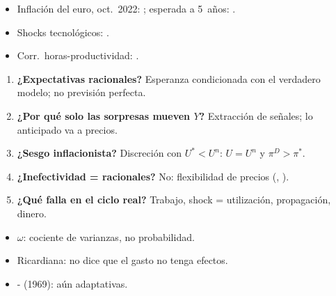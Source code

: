 \documentclass{article}
\begin{document}
\begin{columnas}
\anexorepaso
{}
\begin{itemize}
\item Inflación del euro, oct.\ 2022: ; esperada a 5~años: .
\item Shocks tecnológicos: .
\item Corr.\ horas-productividad: .
\end{itemize}
\begin{enumerate}
\item \textbf{¿Expectativas racionales?} Esperanza condicionada con el verdadero modelo; no previsión perfecta.
\item \textbf{¿Por qué solo las sorpresas mueven $Y$?} Extracción de señales; lo anticipado va a precios.
\item \textbf{¿Sesgo inflacionista?} Discreción con $U^*<U^n$: $U=U^n$ y $\pi^D>\pi^*$.
\item \textbf{¿Inefectividad = racionales?} No: flexibilidad de precios (, ).
\item \textbf{¿Qué falla en el ciclo real?} Trabajo, shock = utilización, propagación, dinero.
\end{enumerate}
\begin{trampa}
\begin{itemize}
\item $\omega$: cociente de varianzas, no probabilidad.
\item Ricardiana: no dice que el gasto no tenga efectos.
\item {}- (1969): aún adaptativas.
\end{itemize}
\end{trampa}

\end{columnas}
\end{document}
